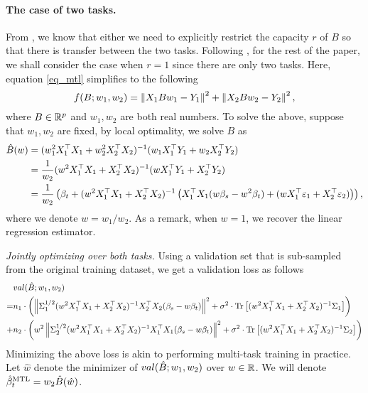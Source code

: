 \paragraph{The case of two tasks.}
From \cite{WZR20}, we know that either we need to explicitly restrict the capacity $r$ of $B$ so that there is transfer between the two tasks.
Following \cite{WZR20}, for the rest of the paper, we shall consider the case when $r=1$ since there are only two tasks.
Here, equation \eqref{eq_mtl} simplifies to the following
\[ f(B; w_1, w_2) = \left\| X_1 B w_1 - Y_1 \right\|^2 + \left\| X_2 B w_2 - Y_2 \right\|^2, \]
where $B\in\mathbb{R}^p$ and $w_1, w_2$ are both real numbers.
To solve the above, suppose that $w_1, w_2$ are fixed, by local optimality, we solve $B$ as
\begin{align*}
	\hat{B}(w) &= (w_1^2 X_1^{\top}X_1 + w_2^2 X_2^{\top}X_2)^{-1} (w_1 X_1^{\top}Y_1 + w_2 X_2^{\top}Y_2) \\
	&= \frac{1}{w_2} (w^2 X_1^{\top}X_1 + X_2^{\top}X_2)^{-1} (w X_1^{\top}Y_1 + X_2^{\top}Y_2) \\
	&= \frac{1}{w_2}\left({\beta_t + (w^2 X_1^{\top}X_1 + X_2^{\top}X_2)^{-1}\left({X_1^{\top}X_1(w\beta_s - w^2\beta_t) + (w X_1^{\top}\varepsilon_1 + X_2^{\top}\varepsilon_2)}\right)}\right),
\end{align*}
where we denote $w = w_1 / w_2$.
As a remark, when $w = 1$, we recover the linear regression estimator.

\medskip
\noindent\textit{Jointly optimizing over both tasks.}
Using a validation set that is sub-sampled from the original training dataset, we get a validation loss as follows
\begin{align}
		&val(\hat{B}; w_1, w_2) \nonumber\\
	=& n_1 \cdot \left({\left\| \Sigma_1^{1/2}(w^2 X_1^{\top}X_1 + X_2^{\top}X_2)^{-1}X_2^{\top}X_2(\beta_s - w\beta_t) \right\|^2 + \sigma^2 \cdot \operatorname{Tr}\left[(w^2 X_1^{\top}X_1 + X_2^{\top}X_2)^{-1}\Sigma_1\right]}\right) \nonumber \\
	+& n_2 \cdot \left({w^2\left\| \Sigma_2^{1/2}(w^2 X_1^{\top}X_1 + X_2^{\top}X_2)^{-1}X_1^{\top}X_1(\beta_s - w\beta_t) \right\|^2 + \sigma^2 \cdot \operatorname{Tr}\left[(w^2 X_1^{\top}X_1 + X_2^{\top}X_2)^{-1}\Sigma_2\right]}\right) \label{eq_val_mtl}
\end{align}
Minimizing the above loss is akin to performing multi-task training in practice.
Let $\hat{w}$ denote the minimizer of $val(\hat{B}; w_1, w_2)$ over $w\in\mathbb{R}$.
We will denote $\hat{\beta}_t^{\text{MTL}} = w_{2}\hat{B}(\hat{w})$.

